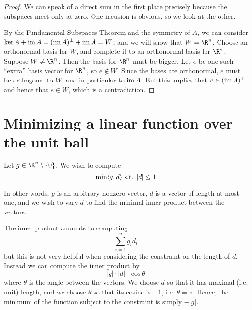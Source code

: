 \documentclass[11pt,letterpaper]{article}
\begin{document}
\begin{proof}
    We can speak of a direct sum in the first place precisely because the
    subspaces meet only at zero.
    One incusion is obvious, so we look at the other.

    By the Fundamental Subspaces Theorem and the symmetry of $A$,
    we can consider
    $\operatorname{ker} A + \operatorname{im} A = (\operatorname{im} A)^\perp + \operatorname{im} A = W$, and we will show that
    $W = \R^n$.
    Choose an orthonormal basis for $W$, and complete it to an orthonormal
    basis for $\R^n$. Suppose $W \neq \R^n$.
    Then the basis for $\R^n$ must be bigger.
    Let $e$ be one such ``extra'' basis vector for $\R^n$,
    so $e \notin W$.
    Since the bases are orthonormal, $e$ must be orthogonal to $W$, and in
    particular to $\operatorname{im} A$. But this implies that $e \in (\operatorname{im} A)^\perp$ and
    hence that $e \in W$, which is a contradiction.
\end{proof}

\section{Minimizing a linear function over the unit ball}

Let $g \in \R^n \setminus \{0\}$. We wish to compute
%
\begin{equation*}
    \min \langle g, d\rangle \text{ s.t. } |d| \leq 1
\end{equation*}

In other words, $g$ is an arbitrary nonzero vector, $d$ is a vector of
length at most one, and we wish to vary $d$ to find the minimal inner product
between the vectors.

The inner product amounts to computing
%
\begin{equation*}
    \sum_{i=1}^n g_i d_i
\end{equation*}
%
but this is not very helpful when considering the constraint on the length of
$d$. Instead we can compute the inner product by
%
\begin{equation*}
    |g| \cdot |d| \cdot \cos \theta
\end{equation*}
%
where $\theta$ is the angle between the vectors.
We choose $d$ so that it has maximal (i.e. unit) length, and we choose $\theta$
so that its cosine is $-1$, i.e. $\theta = \pi$.
Hence, the minimum of the function subject to the constraint is simply $-|g|$.
\end{document}
